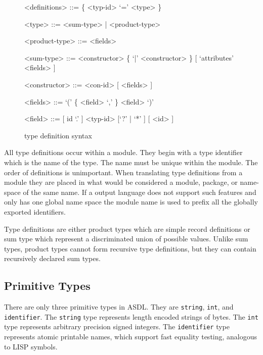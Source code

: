 \begin{figure}[ht]
  \begin{center}
    \begin{grammar}
      <definitions>  ::=  \{ <typ-id> `=' <type> \}

      <type>         ::= <sum-type> | <product-type>

      <product-type> ::= <fields>

      <sum-type>     ::= <constructor> \{ `|' <constructor> \} [ `attributes' <fields> ]

      <constructor>  ::= <con-id> [ <fields> ]

      <fields>       ::= `(' \{ <field>  `,' \} <field> `)'

      <field>        ::= [ id `.' ] <typ-id> [`?' | `*' ]  [ <id> ]
    \end{grammar}
  \end{center}
  \caption{\asdl{} type definition syntax}
\end{figure}%

All type definitions occur within a module.  They begin with a type
identifier which is the name of the type. The name must be unique within the
module. The order of definitions is unimportant. When translating type
definitions from a module they are placed in what would be considered a
module, package, or name-space of the same name. If a output language does
not support such features and only has one global name space the module name
is used to prefix all the globally exported identifiers.

Type definitions are either product types which are simple record definitions
or sum type which represent a discriminated union of possible values. Unlike
sum types, product types cannot form recursive type definitions, but they can
contain recursively declared sum types.

\subsection{Primitive Types}
There are only three primitive types in ASDL. They
are \lstinline[language=ASDL]!string!, \lstinline[language=ASDL]!int!, and \lstinline[language=ASDL]!identifier!. The \lstinline[language=ASDL]!string! type
represents length encoded strings of bytes. The \lstinline[language=ASDL]!int! type represents
arbitrary precision signed integers. The \lstinline[language=ASDL]!identifier! type represents
atomic printable names, which support fast equality testing, analogous to
LISP symbols.

